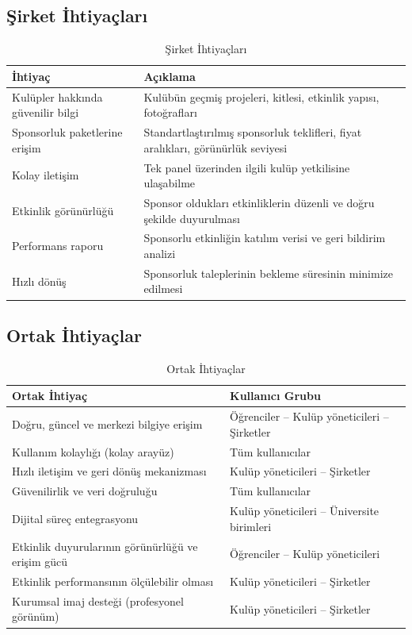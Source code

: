 \documentclass[a4paper,12pt]{report}
\begin{document}
\subsection{Şirket İhtiyaçları}

\begin{table}[H]
\centering
\small
\begin{tabular}{|p{5cm}|p{9cm}|}
\hline
\textbf{İhtiyaç} & \textbf{Açıklama} \\
\hline
Kulüpler hakkında güvenilir bilgi & Kulübün geçmiş projeleri, kitlesi, etkinlik yapısı, fotoğrafları \\
\hline
Sponsorluk paketlerine erişim & Standartlaştırılmış sponsorluk teklifleri, fiyat aralıkları, görünürlük seviyesi \\
\hline
Kolay iletişim & Tek panel üzerinden ilgili kulüp yetkilisine ulaşabilme \\
\hline
Etkinlik görünürlüğü & Sponsor oldukları etkinliklerin düzenli ve doğru şekilde duyurulması \\
\hline
Performans raporu & Sponsorlu etkinliğin katılım verisi ve geri bildirim analizi \\
\hline
Hızlı dönüş & Sponsorluk taleplerinin bekleme süresinin minimize edilmesi \\
\hline
\end{tabular}
\caption{Şirket İhtiyaçları}
\end{table}

\subsection{Ortak İhtiyaçlar}

\begin{table}[H]
\centering
\small
\begin{tabular}{|p{6cm}|p{8cm}|}
\hline
\textbf{Ortak İhtiyaç} & \textbf{Kullanıcı Grubu} \\
\hline
Doğru, güncel ve merkezi bilgiye erişim & Öğrenciler – Kulüp yöneticileri – Şirketler \\
\hline
Kullanım kolaylığı (kolay arayüz) & Tüm kullanıcılar \\
\hline
Hızlı iletişim ve geri dönüş mekanizması & Kulüp yöneticileri – Şirketler \\
\hline
Güvenilirlik ve veri doğruluğu & Tüm kullanıcılar \\
\hline
Dijital süreç entegrasyonu & Kulüp yöneticileri – Üniversite birimleri \\
\hline
Etkinlik duyurularının görünürlüğü ve erişim gücü & Öğrenciler – Kulüp yöneticileri \\
\hline
Etkinlik performansının ölçülebilir olması & Kulüp yöneticileri – Şirketler \\
\hline
Kurumsal imaj desteği (profesyonel görünüm) & Kulüp yöneticileri – Şirketler \\
\hline
\end{tabular}
\caption{Ortak İhtiyaçlar}
\end{table}
\end{document}
